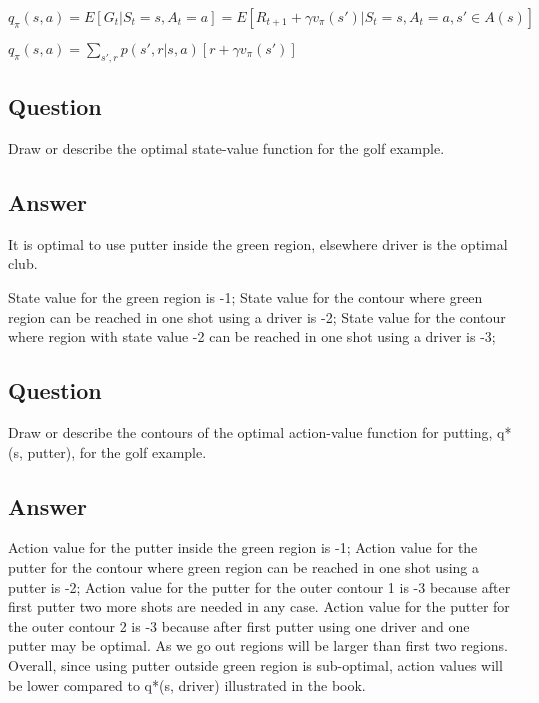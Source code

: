 \documentclass[11pt]{article}
\begin{document}
    $ q_{\pi}(s, a) = E[G_{t}|S_{t}=s, A_{t}=a] = E[R_{t+1} + \gamma v_{\pi}(s') |S_{t}=s, A_{t}=a, s' \in A(s)] $

    $ q_{\pi}(s, a) = \sum_{s',r} p(s', r | s, a) [r + \gamma v_{\pi}(s')] $

    \subsection{Question}

    Draw or describe the optimal state-value function for the golf example.

    \subsection*{Answer}

    It is optimal to use putter inside the green region, elsewhere driver is the optimal club.

    State value for the green region is -1;
    State value for the contour where green region can be reached in one shot using a driver is -2;
    State value for the contour where region with state value -2 can be reached in one shot using a driver is -3;

    \subsection{Question}

    Draw or describe the contours of the optimal action-value function for putting, q*(s, putter), for the golf example.

    \subsection*{Answer}

    Action value for the putter inside the green region is -1;
    Action value for the putter for the contour where green region can be reached in one shot using a putter is -2;
    Action value for the putter for the outer contour 1 is -3 because after first putter two more shots are needed in any case.
    Action value for the putter for the outer contour 2 is -3 because after first putter using one driver and one putter may be optimal.
    As we go out regions will be larger than first two regions.
    Overall, since using putter outside green region is sub-optimal, action values will be lower compared to q*(s, driver) illustrated in the book.
\end{document}
